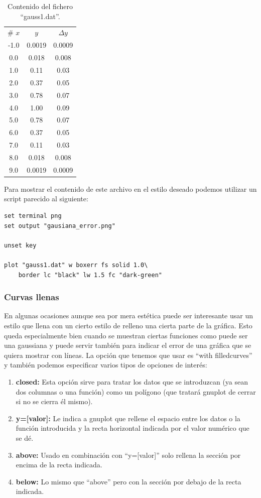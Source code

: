 \documentclass[11pt,a4paper,twoside,pdf]{article}
\numberwithin{equation}{section}
\begin{document}
\begin{table}[h]
	\centering
	\caption{Contenido del fichero ``gauss1.dat''.}
	\label{tab:FicheroGaussErrores}
	\begin{tabular}{ccc}
	\# $x$ & $y$ & $\Delta y$ \\
	-1.0 & 0.0019 & 0.0009 \\
	0.0 & 0.018 & 0.008 \\
	1.0 & 0.11 & 0.03 \\
	2.0 & 0.37 & 0.05 \\
	3.0 & 0.78 & 0.07 \\
	4.0 & 1.00 & 0.09 \\
	5.0 & 0.78 & 0.07 \\
	6.0 & 0.37 & 0.05 \\
	7.0 & 0.11 & 0.03 \\ 
	8.0 & 0.018 & 0.008 \\
	9.0 & 0.0019 & 0.0009
	\end{tabular}
\end{table}

Para mostrar el contenido de este archivo en el estilo deseado podemos utilizar un script parecido al siguiente:

\begin{lstlisting}[language=Gnuplot]
set terminal png
set output "gausiana_error.png"

unset key

plot "gauss1.dat" w boxerr fs solid 1.0\
	border lc "black" lw 1.5 fc "dark-green"
\end{lstlisting}

\subsubsection{Curvas llenas}

En algunas ocasiones aunque sea por mera estética puede ser interesante usar un estilo que llena con un cierto estilo de relleno una cierta parte de la gráfica. Esto queda especialmente bien cuando se muestran ciertas funciones como puede ser una gaussiana y puede servir también para indicar el error de una gráfica que se quiera mostrar con líneas. La opción que tenemos que usar es ``with filledcurves'' y también podemos especificar varios tipos de opciones de interés:

\begin{enumerate}
	\item \textbf{closed:} Esta opción sirve para tratar los datos que se introduzcan (ya sean dos columnas o una función) como un polígono (que tratará gnuplot de cerrar si no se cierra él mismo).
	\item \textbf{y=[valor]:} Le indica a gnuplot que rellene el espacio entre los datos o la función introducida y la recta horizontal indicada por el valor numérico que se dé.
	\item \textbf{above:} Usado en combinación con ``y=[valor]'' solo rellena la sección por encima de la recta indicada.
	\item \textbf{below:} Lo mismo que ``above'' pero con la sección por debajo de la recta indicada.
\end{enumerate}
\end{document}
